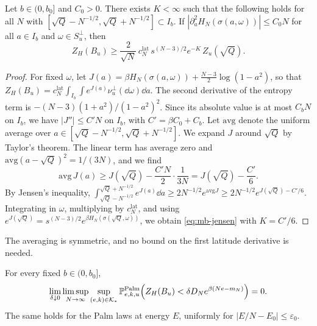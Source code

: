\begin{lemma}\label{lem:mb-jensen}
Let $b\in(0,b_0]$ and $C_0>0$. There exists $K<\infty$ such that the following holds for all $N$ with $[\sqrt Q-N^{-1/2},\sqrt Q+N^{-1/2}]\subset I_b$. If $|\partial_a^2H_N(\sigma(a,\omega))|\le C_0N$ for all $a\in I_b$ and $\omega\in S_u^\perp$, then
\begin{equation}\label{eq:mb-jensen}
Z_H(B_u)\ge\frac2{\sqrt N}\,c_N^{\mathrm{lat}}\,s^{(N-3)/2}e^{-K}\,Z_u(\sqrt Q).
\end{equation}
\end{lemma}

\begin{proof}
For fixed $\omega$, let $J(a)=\beta H_N(\sigma(a,\omega))+\frac{N-3}2\log(1-a^2)$, so that $Z_H(B_u)=c_N^{\mathrm{lat}}\int_{I_b}\int e^{J(a)}\nu_u^\perp(\dd\omega)\dd a$. The second derivative of the entropy term is $-(N-3)(1+a^2)/(1-a^2)^2$. Since its absolute value is at most $C_bN$ on $I_b$, we have $|J''|\le C'N$ on $I_b$, with $C'=\beta C_0+C_b$. Let $\mathrm{avg}$ denote the uniform average over $a\in[\sqrt Q-N^{-1/2},\sqrt Q+N^{-1/2}]$. We expand $J$ around $\sqrt Q$ by Taylor's theorem. The linear term has average zero and $\mathrm{avg}(a-\sqrt Q)^2=1/(3N)$, and we find
\[
\mathrm{avg}\,J(a)\ge J(\sqrt Q)-\frac{C'N}2\cdot\frac1{3N}=J(\sqrt Q)-\frac{C'}6 .
\]
By Jensen's inequality, $\int_{\sqrt Q-N^{-1/2}}^{\sqrt Q+N^{-1/2}}e^{J(a)}\dd a\ge2N^{-1/2}e^{\mathrm{avg}J}\ge2N^{-1/2}e^{J(\sqrt Q)-C'/6}$. Integrating in $\omega$, multiplying by $c_N^{\mathrm{lat}}$, and using $e^{J(\sqrt Q)}=s^{(N-3)/2}e^{\beta H_N(\sigma(\sqrt Q,\omega))}$, we obtain \eqref{eq:mb-jensen} with $K=C'/6$.
\end{proof}

The averaging is symmetric, and no bound on the first latitude derivative is needed.

\begin{proposition}\label{prop:mb-lower}
For every fixed $b\in(0,b_0]$,
\begin{equation}\label{eq:mb-lower}
\lim_{\delta\downarrow0}\limsup_{N\to\infty}\sup_{(e,k)\in\mathcal K_*}\mathbb P^{\mathrm{Palm}}_{e,k,u}\Bigl(Z_H(B_u)<\delta D_Ne^{\beta(Ne-m_N)}\Bigr)=0 .
\end{equation}
The same holds for the Palm laws at energy $E$, uniformly for $|E/N-E_0|\le\varepsilon_0$.
\end{proposition}

